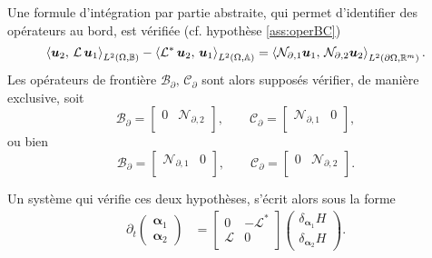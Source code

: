 \begin{hypothese}\label{ass:operBC_fr}
Une formule d'intégration par partie abstraite, qui permet d'identifier des opérateurs au bord, est vérifiée (cf. hypothèse \ref{ass:operBC})
\begin{equation*}
\inner[L^2(\Omega, \mathbb{B})]{\bm{u}_2}{\mathcal{L}\,\bm{u}_1} - \inner[L^2(\Omega, \mathbb{A})]{\mathcal{L}^* \, \bm{u}_2}{\bm{u}_1} = \inner[L^2(\partial \Omega, \mathbb{R}^m)]{\mathcal{N}_{\partial, 1} \bm{u}_1}{\mathcal{N}_{\partial, 2} \bm{u}_2}.
\end{equation*}
Les opérateurs de frontière $\mathcal{B}_\partial, \, \mathcal{C}_\partial$ sont alors supposés vérifier, de manière exclusive, soit
\begin{equation*}
\mathcal{B}_\partial = \begin{bmatrix}
0 & \mathcal{N}_{\partial, 2} \\
\end{bmatrix}, \qquad 
\mathcal{C}_\partial = \begin{bmatrix}
\mathcal{N}_{\partial, 1} & 0 \\
\end{bmatrix},
\end{equation*}
ou bien 
\begin{equation*}
\mathcal{B}_\partial = \begin{bmatrix}
\mathcal{N}_{\partial, 1} & 0 \\
\end{bmatrix}, \qquad \mathcal{C}_\partial = \begin{bmatrix}
0 & \mathcal{N}_{\partial, 2} \\
\end{bmatrix}.
\end{equation*}
\end{hypothese}

Un système qui vérifie ces deux hypothèses, s'écrit alors sous la forme
\begin{equation*}
	\begin{aligned}
	\partial_t \begin{pmatrix}
	{\bm{\alpha}}_1 \\ {\bm{\alpha}}_2
	\end{pmatrix} &= \begin{bmatrix}
	0 & - \mathcal{L}^* \\
	\mathcal{L} & 0 \\
	\end{bmatrix}\begin{pmatrix}
	\delta_{\bm{\alpha}_1}H \\ \delta_{\bm{\alpha}_2}H
	\end{pmatrix}.
	\end{aligned}
\end{equation*}

